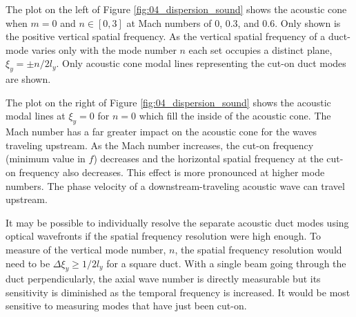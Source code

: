 The plot on the left of Figure \ref{fig:04_dispersion_sound} shows the acoustic cone when $m=0$ and $n\in [0,3]$ at Mach numbers of 0, 0.3, and 0.6.
Only shown is the positive vertical spatial frequency.
As the vertical spatial frequency of a duct-mode varies only with the mode number $n$ each set occupies a distinct plane, $\xi_y=\pm n/2l_y$.
Only acoustic cone modal lines representing the cut-on duct modes are shown.

The plot on the right of Figure \ref{fig:04_dispersion_sound} shows the acoustic modal lines at $\xi_y=0$ for $n=0$ which fill the inside of the acoustic cone.
The Mach number has a far greater impact on the acoustic cone for the waves traveling upstream.
As the Mach number increases, the cut-on frequency (minimum value in $f$) decreases and the horizontal spatial frequency at the cut-on frequency also decreases.
This effect is more pronounced at higher mode numbers.
The phase velocity of a downstream-traveling acoustic wave can travel upstream.

It may be possible to individually resolve the separate acoustic duct modes using optical wavefronts if the spatial frequency resolution were high enough.
To measure of the vertical mode number, $n$, the spatial frequency resolution would need to be $\Delta\xi_y\ge 1/2l_y$ for a square duct.
With a single beam going through the duct perpendicularly, the axial wave number is directly measurable but its sensitivity is diminished as the temporal frequency is increased.
It would be most sensitive to measuring modes that have just been cut-on.

